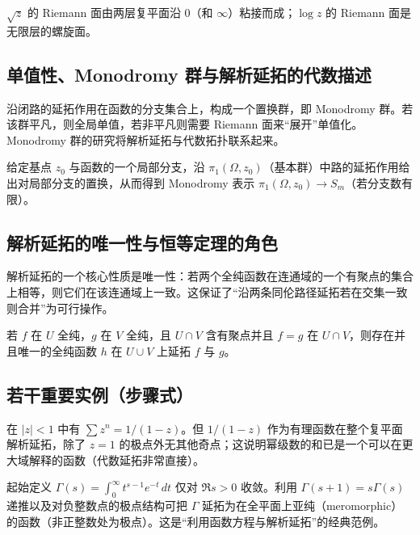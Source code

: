 \documentclass[lang=cn,10pt]{elegantbook}
\begin{document}
	\begin{example}
		\(\sqrt{z}\) 的 Riemann 面由两层复平面沿 \(0\)（和 \(\infty\)）粘接而成；\(\log z\) 的 Riemann 面是无限层的螺旋面。
	\end{example}
	
	\subsection*{单值性、Monodromy 群与解析延拓的代数描述}
	沿闭路的延拓作用在函数的分支集合上，构成一个置换群，即 Monodromy 群。若该群平凡，则全局单值，若非平凡则需要 Riemann 面来“展开”单值化。Monodromy 群的研究将解析延拓与代数拓扑联系起来。
	
	\begin{definition}[Monodromy 群（概要）]
		给定基点 \(z_0\) 与函数的一个局部分支，沿 \(\pi_1(\Omega,z_0)\)（基本群）中路的延拓作用给出对局部分支的置换，从而得到 Monodromy 表示 \(\pi_1(\Omega,z_0)\to S_m\)（若分支数有限）。
	\end{definition}
	
	\subsection*{解析延拓的唯一性与恒等定理的角色}
	解析延拓的一个核心性质是唯一性：若两个全纯函数在连通域的一个有聚点的集合上相等，则它们在该连通域上一致。这保证了“沿两条同伦路径延拓若在交集一致则合并”为可行操作。
	
	\begin{definition}
		若 \(f\) 在 \(U\) 全纯，\(g\) 在 \(V\) 全纯，且 \(U\cap V\) 含有聚点并且 \(f=g\) 在 \(U\cap V\)，则存在并且唯一的全纯函数 \(h\) 在 \(U\cup V\) 上延拓 \(f\) 与 \(g\)。
	\end{definition}
	
	\subsection*{若干重要实例（步骤式）}
	
	\begin{example}
		在 \(|z|<1\) 中有 \(\sum z^n = 1/(1-z)\)。但 \(1/(1-z)\) 作为有理函数在整个复平面解析延拓，除了 \(z=1\) 的极点外无其他奇点；这说明幂级数的和已是一个可以在更大域解释的函数（代数延拓非常直接）。
	\end{example}
	
	\begin{example}
		起始定义 \(\Gamma(s)=\int_0^\infty t^{s-1}e^{-t}\,dt\) 仅对 \(\Re s>0\) 收敛。利用 \(\Gamma(s+1)=s\Gamma(s)\) 递推以及对负整数点的极点结构可把 \(\Gamma\) 延拓为在全平面上亚纯（meromorphic）的函数（非正整数处为极点）。这是“利用函数方程与解析延拓”的经典范例。
	\end{example}
	
\end{document}
